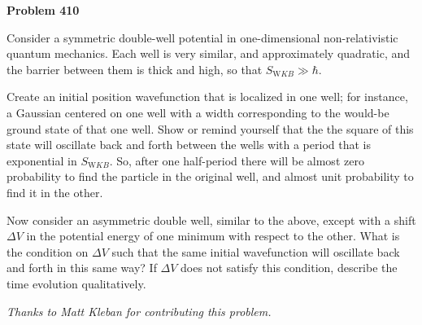 \documentclass[12pt]{article}
\begin{document}
\begin{pottproblem}
\textbf{Problem 410}

Consider a symmetric double-well potential in one-dimensional non-relativistic
quantum mechanics.  Each well is very similar, and approximately quadratic, and the
barrier between them is thick and high, so that $S_{\mathrm WKB} \gg
\hbar$.

Create an initial position wavefunction that is localized
in one well; for instance, a Gaussian centered on one well with a
width corresponding to the would-be ground state of that one well.
Show or remind yourself
that the the square of this state will oscillate back and forth
between the wells with a period that is exponential in $S_{\mathrm WKB}$.
So, after one half-period there will be almost zero probability to
find the particle in the original well, and almost unit probability to find it in
the other.

Now consider an asymmetric double well, similar to the above, except
with a shift $\Delta V$ in the potential energy of one minimum with
respect to the other.  What is the condition on $\Delta V$ such that
the same initial wavefunction will oscillate back and forth in this
same way?  If $\Delta V$ does not satisfy this condition, describe the
time evolution qualitatively.

{\normalsize\emph{Thanks to Matt Kleban for contributing this problem.}}
\end{pottproblem}
\end{document}
